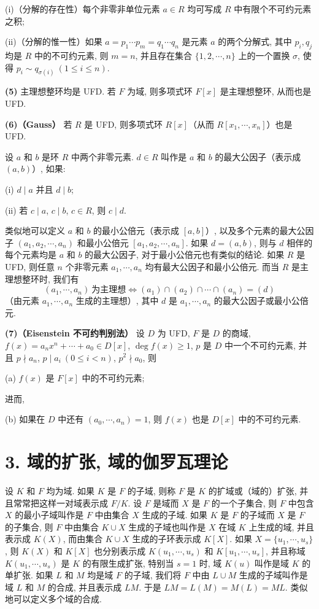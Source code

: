 (i)（分解的存在性）每个非零非单位元素 $a\in R$ 均可写成 $R$ 中有限个不可约元素之积;

(ii)（分解的惟一性）如果 $a=p_1\cdots p_m=q_1\cdots q_n$ 是元素 $a$ 的两个分解式, 其中 $p_i,q_j$ 均是 $R$ 中的不可约元素, 则 $m=n$, 并且存在集合 $\{1,2,\cdots,n\}$ 上的一个置换 $\sigma$, 使得 $p_i\sim q_{\sigma(i)}\ (1\leqslant i\leqslant n)$.

\textbf{(5)} 主理想整环均是 UFD. 若 $F$ 为域, 则多项式环 $F[x]$ 是主理想整环, 从而也是 UFD.

\textbf{(6)（Gauss）} 若 $R$ 是 UFD, 则多项式环 $R[x]$（从而 $R[x_1,\cdots,x_n]$）也是 UFD.

设 $a$ 和 $b$ 是环 $R$ 中两个非零元素. $d\in R$ 叫作是 $a$ 和 $b$ 的最大公因子（表示成 $(a,b)$）, 如果:

(i) $d\mid a$ 并且 $d\mid b$;

(ii) 若 $c\mid a$, $c\mid b$, $c\in R$, 则 $c\mid d$.

类似地可以定义 $a$ 和 $b$ 的最小公倍元（表示成 $[a,b]$）, 以及多个元素的最大公因子 $(a_1,a_2,\cdots,a_n)$ 和最小公倍元 $[a_1,a_2,\cdots,a_n]$. 如果 $d=(a,b)$, 则与 $d$ 相伴的每个元素均是 $a$ 和 $b$ 的最大公因子, 对于最小公倍元也有类似的结论. 如果 $R$ 是 UFD, 则任意 $n$ 个非零元素 $a_1,\cdots,a_n$ 均有最大公因子和最小公倍元. 而当 $R$ 是主理想整环时, 我们有
\[
  (a_1,\cdots,a_n)\ \text{为主理想} \Leftrightarrow
  (a_1)\cap(a_2)\cap\cdots\cap(a_n)=(d)
\]
（由元素 $a_1,\cdots,a_n$ 生成的主理想）, 其中 $d$ 是 $a_1,\cdots,a_n$ 的最大公因子或最小公倍元.

\textbf{(7)（Eisenstein 不可约判别法）} 设 $D$ 为 UFD, $F$ 是 $D$ 的商域, $f(x)=a_nx^n+\cdots+a_0\in D[x]$, $\deg f(x)\geqslant 1$, $p$ 是 $D$ 中一个不可约元素, 并且 $p\nmid a_n$, $p\mid a_i\ (0\leqslant i<n)$, $p^2\nmid a_0$, 则

(a) $f(x)$ 是 $F[x]$ 中的不可约元素;

进而,

(b) 如果在 $D$ 中还有 $(a_0,\cdots,a_n)=1$, 则 $f(x)$ 也是 $D[x]$ 中的不可约元素.

\section*{3. 域的扩张, 域的伽罗瓦理论}

设 $K$ 和 $F$ 均为域. 如果 $K$ 是 $F$ 的子域, 则称 $F$ 是 $K$ 的扩域或（域的）扩张, 并且常常把这样一对域表示成 $F/K$. 设 $F$ 是域而 $X$ 是 $F$ 的一个子集合, 则 $F$ 中包含 $X$ 的最小子域叫作是 $F$ 中由集合 $X$ 生成的子域. 如果 $K$ 是 $F$ 的子域而 $X$ 是 $F$ 的子集合, 则 $F$ 中由集合 $K\cup X$ 生成的子域也叫作是 $X$ 在域 $K$ 上生成的域, 并且表示成 $K(X)$, 而由集合 $K\cup X$ 生成的子环表示成 $K[X]$. 如果 $X=\{u_1,\cdots,u_s\}$, 则 $K(X)$ 和 $K[X]$ 也分别表示成 $K(u_1,\cdots,u_s)$ 和 $K[u_1,\cdots,u_s]$, 并且称域 $K(u_1,\cdots,u_s)$ 是 $K$ 的有限生成扩张, 特别当 $s=1$ 时, 域 $K(u)$ 叫作是域 $K$ 的单扩张. 如果 $L$ 和 $M$ 均是域 $F$ 的子域, 我们将 $F$ 中由 $L\cup M$ 生成的子域叫作是域 $L$ 和 $M$ 的合成, 并且表示成 $LM$. 于是 $LM=L(M)=M(L)=ML$. 类似地可以定义多个域的合成.

